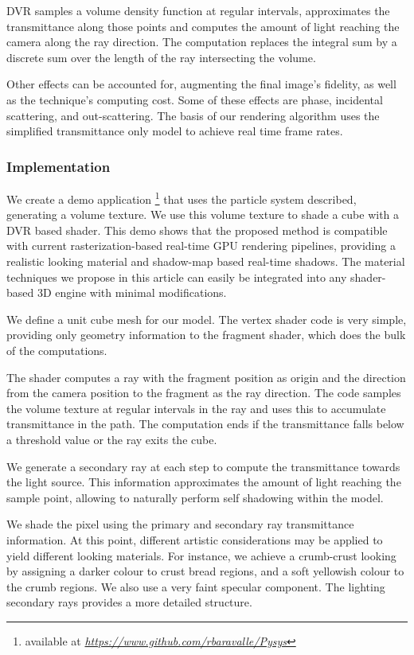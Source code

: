 \documentclass[oneside,a4paper,english,links]{amca}
\begin{document}
DVR samples a volume density function at
regular intervals, approximates the transmittance along those points and computes the amount of light reaching the camera along the ray direction. The computation replaces the integral sum by a discrete sum over the length of the ray intersecting the volume.

Other effects can be accounted for, augmenting the final image's fidelity, as well as the technique's computing cost. Some of these effects are phase, incidental scattering, and
out-scattering. The basis of our rendering algorithm uses the simplified
transmittance only model to achieve real time frame rates.

\subsubsection{Implementation}

We create a demo application \footnote{available at
  \emph{\url{https://www.github.com/rbaravalle/Pysys}}} that uses the particle
system described, generating a volume texture. We use this volume texture to shade a cube with a DVR based shader. This demo shows
that the proposed method is compatible with current
rasterization-based real-time GPU rendering pipelines, providing a
realistic looking material and shadow-map based real-time
shadows. The material techniques we propose in this
article  can easily be integrated into any shader-based 3D engine with
minimal modifications.

We define a unit cube mesh for our model. The vertex shader code is very simple, providing only geometry information to the fragment shader, which does the bulk of the
computations. 

The shader computes a ray with the fragment position as origin and
the direction from the camera position to the fragment as the ray
direction. The code samples the volume texture at regular intervals in the ray
 and uses this to accumulate transmittance in the path. The computation ends if the transmittance falls below a threshold value or the ray exits the cube.

We generate a secondary ray at each step to compute the transmittance towards the light source. This information approximates the amount of light reaching the sample point, allowing to naturally perform self shadowing within the model.

We shade the pixel using the primary and secondary ray transmittance information. At this point, different artistic considerations may be applied to yield different
looking materials. For instance, we achieve a crumb-crust looking by assigning a darker colour to crust bread regions, and a soft yellowish colour to the crumb regions. We also use a very faint specular component. The lighting secondary rays provides a more detailed structure.
\end{document}

